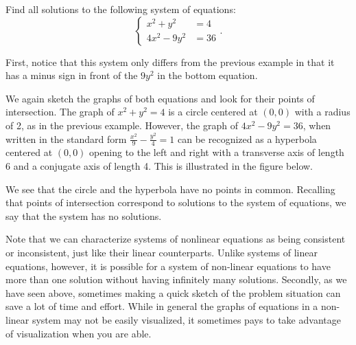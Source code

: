 \documentclass[nooutcomes]{ximera}
\newcommand\tikzhyperbola[6][thick]{%
    \draw [#1, rotate around={#2: (0, 0)}, shift=#3]
        plot [variable = \t, samples=1000, domain=-#6:#6] ({#4 / cos( \t )}, {#5 * tan( \t )});
    \draw [#1, rotate around={#2: (0, 0)}, shift=#3]
        plot [variable = \t, samples=1000, domain=-#6:#6] ({-#4 / cos( \t )}, {#5 * tan( \t )});
}
\begin{document}
\begin{example}
Find all solutions to the following system of equations:
$$
\begin{cases}
x^2 + y^2 & =  4 \\
4x^2 - 9y^2 & = 36
\end{cases}.
$$
\end{example}
\begin{explanation}
First, notice that this system only differs from the previous example in that it has a minus sign in front of the $9y^2$ in the bottom equation.

We again sketch the graphs of both equations and look for their points of intersection. The graph of $x^2 + y^2 = 4$ is a circle centered at $(0, 0)$ with a radius of 2, as in the previous example. However, the graph of $4x^2 - 9y^2 = 36$, when written in the standard form $\frac{x^2}{9} - \frac{y^2}{4} = 1$ can be recognized as a hyperbola centered at $(0, 0)$ opening to the left and right with a transverse axis of length 6 and a conjugate axis of length 4. This is illustrated in the figure below. 
\begin{image}
\end{image}

We see that the circle and the hyperbola have no points in common. Recalling that points of intersection correspond to solutions to the system of equations, we say that the system has no solutions. 
\end{explanation}


Note that we can characterize systems of nonlinear equations as being consistent or inconsistent, just like their linear counterparts. Unlike systems of linear equations, however, it is possible for a system of non-linear equations to have more than one solution without having infinitely many solutions. Secondly, as we have seen above, sometimes making a quick sketch of the problem situation can save a lot of time and effort. While in general the graphs of equations in a non-linear system may not be easily visualized, it sometimes pays to take advantage of visualization when you are able.
\end{document}
